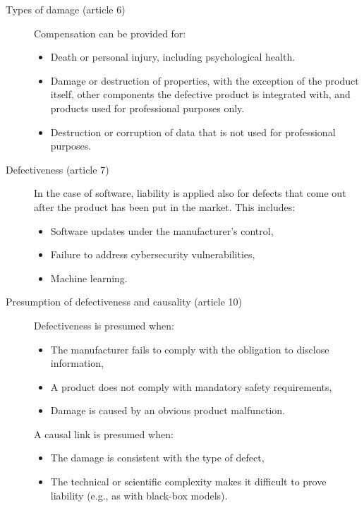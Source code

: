 \begin{description}
    \item[Types of damage (article 6)] 
        Compensation can be provided for:
        \begin{itemize}
            \item Death or personal injury, including psychological health.
            \item Damage or destruction of properties, with the exception of the product itself, other components the defective product is integrated with, and products used for professional purposes only.
            \item Destruction or corruption of data that is not used for professional purposes.
        \end{itemize}

    \item[Defectiveness (article 7)] 
        In the case of software, liability is applied also for defects that come out after the product has been put in the market. This includes:
        \begin{itemize}
            \item Software updates under the manufacturer's control,
            \item Failure to address cybersecurity vulnerabilities,
            \item Machine learning.
        \end{itemize}

    \item[Presumption of defectiveness and causality (article 10)] 
        Defectiveness is presumed when:
        \begin{itemize}
            \item The manufacturer fails to comply with the obligation to disclose information,
            \item A product does not comply with mandatory safety requirements,
            \item Damage is caused by an obvious product malfunction.
        \end{itemize}

        A causal link is presumed when:
        \begin{itemize}
            \item The damage is consistent with the type of defect,
            \item The technical or scientific complexity makes it difficult to prove liability (e.g., as with black-box models).
        \end{itemize}
\end{description}

